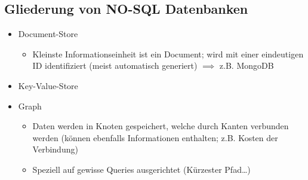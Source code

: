 \subsection{Gliederung von NO-SQL Datenbanken}
\begin{itemize}
    \item Document-Store
    \begin{itemize}
        \item Kleinste Informationseinheit ist ein Document; wird mit einer eindeutigen ID identifiziert (meist automatisch generiert) $\implies$ z.B. MongoDB
    \end{itemize}
    \item Key-Value-Store
    \item Graph
    \begin{itemize}
        \item Daten werden in Knoten gespeichert, welche durch Kanten verbunden werden (können ebenfalls Informationen enthalten; z.B. Kosten der Verbindung)
        \item Speziell auf gewisse Queries ausgerichtet (Kürzester Pfad\dots)
    \end{itemize}
\end{itemize}